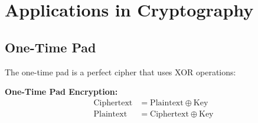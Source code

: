 \documentclass[11pt,a4paper]{article}
\begin{document}
\section{Applications in Cryptography}

\subsection{One-Time Pad}

The one-time pad is a perfect cipher that uses XOR operations:

\begin{theorybox}
\textbf{One-Time Pad Encryption:}
\begin{align*}
\text{Ciphertext} &= \text{Plaintext} \oplus \text{Key} \\
\text{Plaintext} &= \text{Ciphertext} \oplus \text{Key}
\end{align*}
\end{theorybox}
\end{document}
